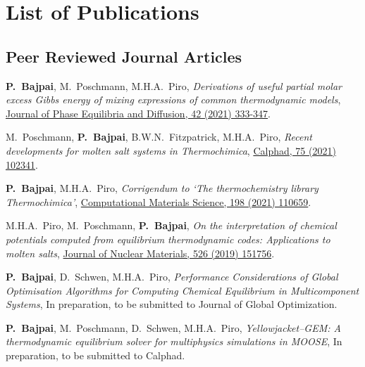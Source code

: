 \chapter*{List of Publications}\label{publications}


{
\onehalfspacing

\section*{Peer Reviewed Journal Articles}
\vspace*{1em}
\begin{enumerate}{\small \compresslist
    \item \textbf{P.\ Bajpai}, {M.\ Poschmann}, {M.H.A.\ Piro}, \textit{Derivations of useful partial molar excess Gibbs energy of mixing expressions of common thermodynamic models}, \href{https://doi.org/10.1007/s11669-021-00886-w}{Journal of Phase Equilibria and Diffusion, 42 (2021) 333-347}.
    \item {M.\ Poschmann}, \textbf{P.\ Bajpai}, {B.W.N.\ Fitzpatrick}, {M.H.A.\ Piro}, \textit{Recent developments for molten salt systems in Thermochimica}, \href{https://doi.org/10.1016/j.calphad.2021.102341}{Calphad, 75 (2021) 102341}.
    \item \textbf{P.\ Bajpai}, {M.H.A.\ Piro}, \textit{Corrigendum to `The thermochemistry library Thermochimica'}, \href{https://doi.org/10.1016/j.commatsci.2021.110659}{Computational Materials Science, 198 (2021) 110659}.
    \item {M.H.A.\ Piro}, {M.\ Poschmann}, \textbf{P.\ Bajpai}, \textit{On the interpretation of chemical potentials computed from equilibrium thermodynamic codes: Applications to molten salts}, \href{https://doi.org/10.1016/j.jnucmat.2019.151756}{Journal of Nuclear Materials, 526 (2019) 151756}.
    \item \textbf{P.\ Bajpai}, {D.\ Schwen}, {M.H.A.\ Piro}, \textit{Performance Considerations of Global Optimisation Algorithms for Computing Chemical Equilibrium in Multicomponent Systems}, {In preparation, to be submitted to Journal of Global Optimization}.
    \item \textbf{P.\ Bajpai}, {M.\ Poschmann}, {D.\ Schwen}, {M.H.A.\ Piro}, \textit{Yellowjacket--GEM: A thermodynamic equilibrium solver for multiphysics simulations in MOOSE}, {In preparation, to be submitted to Calphad}.
}
\end{enumerate}

}
